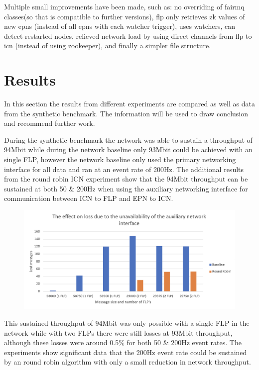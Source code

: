 \documentclass[]{article}
\begin{document}
Multiple small improvements have been made, such as: no overriding of fairmq classes(so that is compatible to further versions), flp only retrieves zk values of new epns (instead of all epns with each watcher trigger), uses watchers, can detect restarted nodes, relieved network load by using direct channels from flp to icn (instead of using zookeeper), and finally a simpler file structure.


\section{Results}
In this section the results from different experiments are compared as well as data from the synthetic benchmark. The information will be used to draw conclusion and recommend further work.

During the synthetic benchmark the network was able to sustain a throughput of 94Mbit while during the network baseline only 93Mbit could be achieved with an single FLP, however the network baseline only used the primary networking interface for all data and ran at an event rate of 200Hz. The additional results from the round robin ICN experiment show that the 94Mbit throughput can be sustained at both 50 \& 200Hz when using the auxiliary networking interface for communication between ICN to FLP and EPN to ICN.

\begin{center}
	\begin{figure}[H]
		\includegraphics[width=\textwidth]{"images/The effect on loss due to the unavailability of the auxiliary network interface"}
	\end{figure}
\end{center}

This sustained throughput of 94Mbit was only possible with a single FLP in the network while with two FLPs there were still losses at 93Mbit throughput, although these losses were around 0.5\% for both 50 \& 200Hz event rates. The experiments show significant data that the 200Hz event rate could be sustained by an round robin algorithm with only a small reduction in network throughput.
\end{document}
